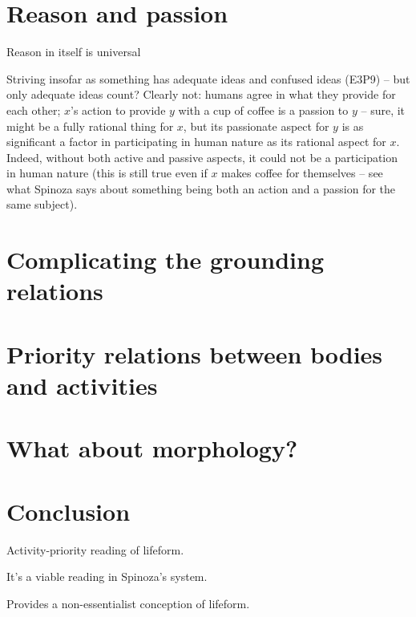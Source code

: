 \documentclass{article}
\begin{document}

\section{Reason and passion}\label{sec:Reason}
Reason in itself is universal

Striving insofar as something has adequate ideas and confused ideas (E3P9) – but only adequate ideas count? Clearly not: humans agree in what they provide for each other; $x$'s action to provide $y$ with a cup of coffee is a passion to $y$ – sure, it might be a fully rational thing for $x$, but its passionate aspect for $y$ is as significant a factor in participating in human nature as its rational aspect for $x$. Indeed, without both active and passive aspects, it could not be a participation in human nature (this is still true even if $x$ makes coffee for themselves – see what Spinoza says about something being both an action and a passion for the same subject).

\section{Complicating the grounding relations}\label{sec:Complicating}

\section{Priority relations between bodies and activities}\label{sec:ObjPriority}

\section{What about morphology?}\label{sec:ObjMorphology}

\section{Conclusion}\label{sec:Conclusion}
Activity-priority reading of lifeform.

It's a viable reading in Spinoza's system.

Provides a non-essentialist conception of lifeform.
\end{document}
